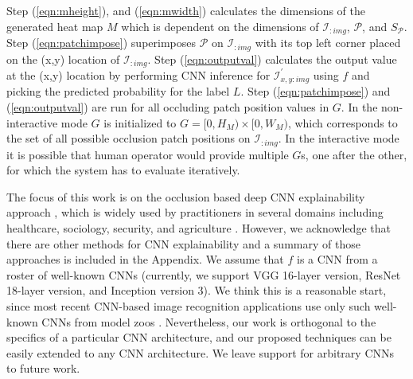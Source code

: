 Step (\ref{eqn:mheight}), and (\ref{eqn:mwidth}) calculates the dimensions of the generated heat map $M$ which is dependent on the dimensions of $\mathcal{I}_{:img}$, $\mathcal{P}$, and $S_\mathcal{P}$.
Step (\ref{eqn:patchimpose}) superimposes $\mathcal{P}$ on $\mathcal{I}_{:img}$ with its top left corner placed on the (x,y) location of $\mathcal{I}_{:img}$.
Step (\ref{eqn:outputval}) calculates the output value at the (x,y) location by performing CNN inference for $\mathcal{I}^{'}_{x,y:img}$ using $f$ and picking the predicted probability for the label $L$.
Step (\ref{eqn:patchimpose}) and (\ref{eqn:outputval}) are run for all occluding patch position values in $G$.
In the non-interactive mode $G$ is initialized to $G = [0, H_M) \times [0, W_M)$, which corresponds to the set of all possible occlusion patch positions on  $\mathcal{I}_{:img}$.
In the interactive mode it is possible that human operator would provide multiple $G$s, one after the other, for which the system has to evaluate iteratively.

The focus of this work is on the occlusion based deep CNN explainability approach \cite{zeiler2014visualizing}, which is widely used by practitioners in several domains including healthcare, sociology, security, and agriculture \cite{kermany2018identifying, islam2017abnormality, mohanty2016using, arbabzadah2016identifying, wang2017deep}.
However, we acknowledge that there are other methods for CNN explainability and a summary of those approaches is included in the Appendix.
We assume that $f$ is a CNN from a roster of well-known CNNs (currently, we support VGG 16-layer version, ResNet 18-layer version, and Inception version 3).
We think this is a reasonable start, since most recent CNN-based image recognition applications use only such well-known CNNs from model zoos \cite{caffemodelzoo, tfmodelzoo}.
Nevertheless, our work is orthogonal to the specifics of a particular CNN architecture, and our proposed techniques can be easily extended to any CNN architecture.
We leave support for arbitrary CNNs to future work.

